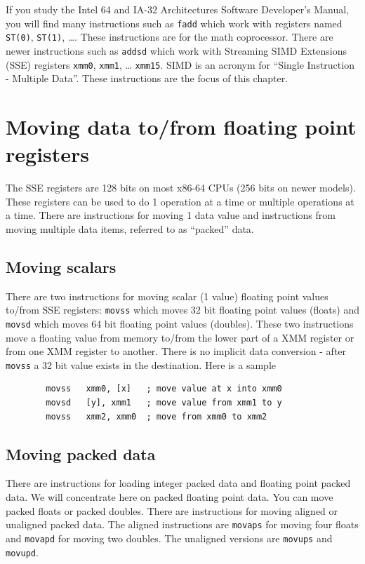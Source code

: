 \documentclass[11pt,b5paper]{book}
\begin{document}
If you study the Intel 64 and IA-32 Architectures Software Developer’s Manual, you will find
many instructions such as {\tt fadd} which work with registers named {\tt ST(0)}, {\tt ST(1)}, \ldots.
These instructions are for the math coprocessor.
There are newer instructions such as {\tt addsd} which work with Streaming SIMD Extensions (SSE) registers {\tt xmm0}, {\tt xmm1}, \ldots
{\tt xmm15}.  
SIMD is an acronym for ``Single Instruction - Multiple Data''.
These instructions are the focus of this chapter.

\section{Moving data to/from floating point registers}

The SSE registers are 128 bits on most x86-64 CPUs (256 bits on newer models).
These registers can be used to do 1 operation at a time or multiple operations at a time.
There are instructions for moving 1 data value and instructions from moving multiple data items,
referred to as ``packed'' data.

\subsection{Moving scalars}

There are two instructions for moving scalar (1 value) floating point values to/from SSE registers:
{\tt movss} which moves 32 bit floating point values (floats) and
{\tt movsd} which moves 64 bit floating point values (doubles).
These two instructions move a floating value from memory to/from the lower part of a XMM register or from
one XMM register to another.
There is no implicit data conversion - after {\tt movss} a 32 bit value exists in the destination.
Here is a sample
\begin{verbatim}
        movss   xmm0, [x]   ; move value at x into xmm0
        movsd   [y], xmm1   ; move value from xmm1 to y
        movss   xmm2, xmm0  ; move from xmm0 to xmm2
\end{verbatim}

\subsection{Moving packed data}

There are instructions for loading integer packed data and floating point packed data.
We will concentrate here on packed floating point data.
You can move packed floats or packed doubles.
There are instructions for moving aligned or unaligned packed data.
The aligned instructions are {\tt movaps} for moving four floats and
{\tt movapd} for moving two doubles.
The unaligned versions are {\tt movups} and {\tt movupd}.
\end{document}
